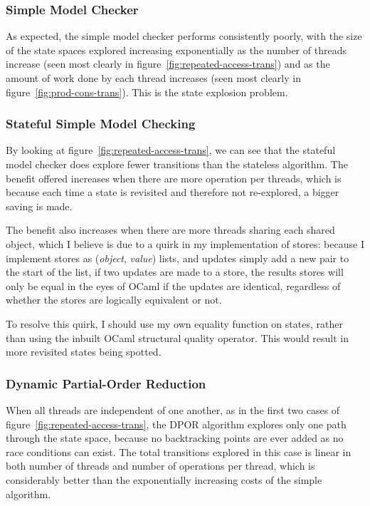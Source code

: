 \documentclass[12pt,a4paper,twoside,openright]{report}
\begin{document}
\subsubsection{Simple Model Checker}
As expected, the simple model checker performs
consistently poorly, with the size of the state
spaces explored increasing exponentially as
the number of threads increase (seen most
clearly in figure~\ref{fig:repeated-access-trans})
and as the amount of work done by each thread
increases (seen most clearly in
figure~\ref{fig:prod-cons-trans}).
This is the state explosion problem.

\subsubsection{Stateful Simple Model Checking}
By looking at figure~\ref{fig:repeated-access-trans},
we can see that the stateful model checker does
explore fewer transitions than the stateless
algorithm. The benefit offered increases
when there are more operation per threads,
which is because each time a state is
revisited and therefore not re-explored,
a bigger saving is made.

The benefit also increases when there are more
threads sharing each shared object, which I
believe is due to a quirk in my implementation
of stores: because I implement stores as
(\textit{object}, \textit{value}) lists,
and updates simply
add a new pair to the start of the list,
if two updates are made to a store, the
results stores will only be equal in
the eyes of OCaml if the updates are
identical, regardless of whether the
stores are logically equivalent or not.

To resolve this quirk, I should use
my own equality function on states,
rather than using the inbuilt
OCaml structural quality operator.
This would result in more
revisited states being spotted.

\subsubsection{Dynamic Partial-Order Reduction}
When all threads are independent of one another,
as in the first two cases of
figure~\ref{fig:repeated-access-trans},
the DPOR algorithm explores only one path
through the state space, because no
backtracking points are ever added as
no race conditions can exist. The total
transitions explored in this case is linear in both
number of threads and number of operations
per thread, which is considerably better
than the exponentially increasing costs
of the simple algorithm.
\end{document}
